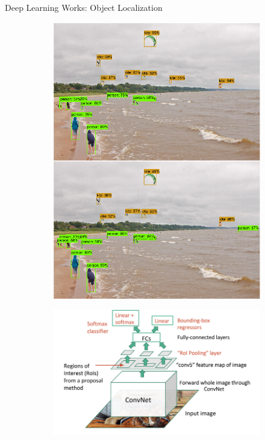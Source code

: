 \documentclass[notheorems]{beamer}
\begin{document}
    \begin{frame}{Deep Learning Works: Object Localization}

        \begin{figure}
            \centering
            \begin{subfigure}[c]{0.45\textwidth}
                \includegraphics[width=\linewidth]{figures/bounding_boxes}
            \end{subfigure}
            \begin{subfigure}[t]{0.45\textwidth}
                \includegraphics[width=\textwidth]{figures/region_based_cnn}
            \end{subfigure}
        \end{figure}


\end{frame}
\end{document}
